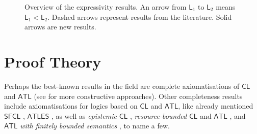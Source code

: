 \documentclass{article}
\begin{document}
\begin{figure}[h!]
\centering
{}
\caption{Overview of the expressivity results. An arrow from $\mathsf{L}_1$ to $\mathsf{L}_2$ means $\mathsf{L}_1 <\mathsf{L}_2$. Dashed arrows represent results from the literature. Solid arrows are new results.}
\label{fig:expressivity}
\end{figure}






\section{Proof Theory}
\label{sec:axiom}

Perhaps the best-known results in the field are complete axiomatisations of $\mathsf{CL}$ \cite{pauly02,goranko13} and $\mathsf{ATL}$ \cite{goranko06} (see \cite{walther06,goranko09} for more constructive approaches). Other completeness results include axiomatisations for logics based on $\mathsf{CL}$ and $\mathsf{ATL}$, like already mentioned $\mathsf{SFCL}$ \cite{goranko18}, $\mathsf{ATLES}$ \cite{walther07}, as well as \textit{epistemic} $\mathsf{CL}$ \cite{agotnes19}, \textit{resource-bounded} $\mathsf{CL}$ \cite{alechina11} and $\mathsf{ATL}$ \cite{nguyen18}, and $\mathsf{ATL}$ \textit{with finitely bounded semantics} \cite{goranko19}, to name a few.
\end{document}
